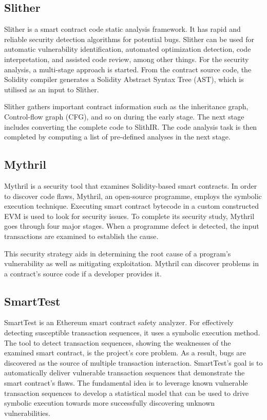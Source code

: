 \documentclass[a4paper,sigconf, language=french,
language=german, language=spanish, language=english]{acmart}
\begin{document}
\subsection{Slither} Slither is a smart contract code static analysis framework.
It has rapid and reliable security detection algorithms for potential bugs.
Slither can be used for automatic vulnerability identification, automated optimization detection, code interpretation, and assisted code review, among other things.
For the security analysis, a multi-stage approach is started.
From the contract source code, the Solidity compiler generates a Solidity Abstract Syntax Tree (AST), which is utilised as an input to Slither.

Slither gathers important contract information such as the inheritance graph, Control-flow graph (CFG), and so on during the early stage.
The next stage includes converting the complete code to SlithIR.
The code analysis task is then completed by computing a list of pre-defined analyses in the next stage. 

\subsection{Mythril} 
Mythril is a security tool that examines Solidity-based smart contracts.
In order to discover code flaws, Mythril, an open-source programme, employs the symbolic execution technique.
Executing smart contract bytecode in a custom constructed EVM is used to look for security issues.
To complete its security study, Mythril goes through four major stages.
When a programme defect is detected, the input transactions are examined to establish the cause.

This security strategy aids in determining the root cause of a program's vulnerability as well as mitigating exploitation.
Mythril can discover problems in a contract's source code if a developer provides it. 

\subsection{SmartTest}
SmartTest is an Ethereum smart contract safety analyzer.
For effectively detecting susceptible transaction sequences, it uses a symbolic execution method.
The tool to detect transaction sequences, showing the weaknesses of the examined smart contract, is the project's core problem.
As a result, bugs are discovered as the source of multiple transaction interaction.
SmartTest's goal is to automatically deliver vulnerable transaction sequences that demonstrate the smart contract's flaws. 
The fundamental idea is to leverage known vulnerable transaction sequences to develop a statistical model that can be used to drive symbolic execution 
towards more successfully discovering unknown vulnerabilities.
\end{document}
